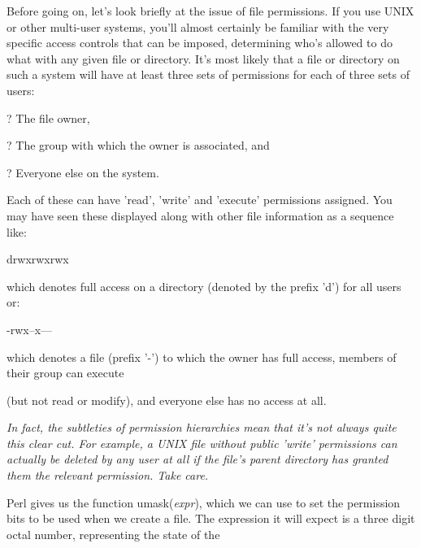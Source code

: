 \documentclass[a4paper,11pt]{book}
\begin{document}
\noindent 

\noindent Before going on, let's look briefly at the issue of file permissions. If you use UNIX or other multi-user systems, you'll almost certainly be familiar with the very specific access controls that can be imposed, determining who's allowed to do what with any given file or directory. It's most likely that a file or directory on such a system will have at least three sets of permissions for each of three sets of users:

\noindent 

\noindent ? The file owner,

\noindent 

\noindent ? The group with which the owner is associated, and

\noindent 

\noindent ? Everyone else on the system.

\noindent 

\noindent Each of these can have 'read', 'write' and 'execute' permissions assigned. You may have seen these displayed along with other file information as a sequence like:

\noindent 

\noindent drwxrwxrwx

\noindent 

\noindent which denotes full access on a directory (denoted by the prefix 'd') for all users or:

\noindent 

\noindent -rwx--x---

\noindent 

\noindent 

\noindent which denotes a file (prefix '-') to which the owner has full access, members of their group can execute

\noindent (but not read or modify), and everyone else has no access at all.

\noindent 

\noindent 

\noindent \textit{In fact, the subtleties of permission hierarchies mean that it's not always quite this clear cut. For example, a UNIX file without public 'write' permissions can actually be deleted by any user at all if the file's parent directory has granted them the relevant permission. Take care.}

\noindent 

\noindent Perl gives us the function umask(\textit{expr}), which we can use to set the permission bits to be used when we create a file. The expression it will expect is a three digit octal number, representing the state of the
\end{document}
